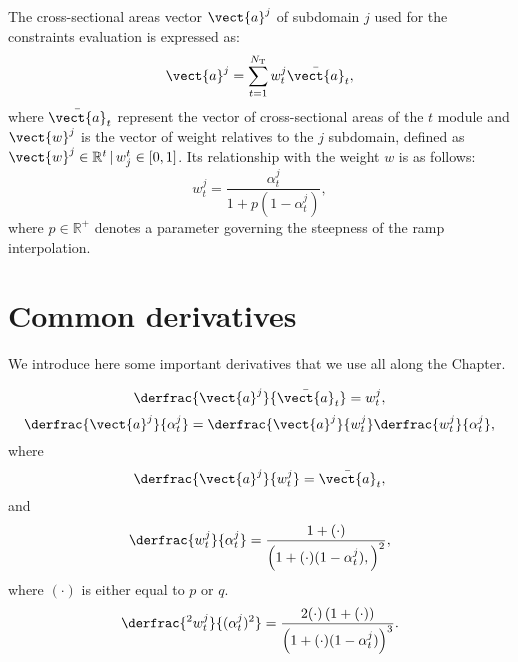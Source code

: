 The cross-sectional areas vector $\vect{a}^j$ of subdomain $j$ used for the constraints evaluation is expressed as:  
\begin{equation}
    \vect{a}^j = \sum_{t=1}^{N_\text{T}} w_t^j \bar{\vect{a}}_t, 
\end{equation}
where $\bar{\vect{a}}_t $ represent the vector of cross-sectional areas of the $t$ module and $\vect{w}^j$ is the vector of weight relatives to the $j$ subdomain, defined as $ \vect{w}^j \in \mathbb{R}^t\,|\,w_j^t \in [0,1]$. Its relationship with the weight $w$ is as follows:
\begin{equation}
    w_t^j = \frac{\alpha_t^j}{1+p(1-\alpha_t^j)},    
\end{equation}
where $p \in \mathbb{R}^+$ denotes a parameter governing the steepness of the \gls{ramp} interpolation.

\section{Common derivatives}
We introduce here some important derivatives that we use all along the Chapter.

\begin{equation}
    \derfrac{\vect{a}^j}{\bar{\vect{a}}_t} = w_t^j,
    \label{eq:appA_02}
\end{equation}
\begin{equation}
    \derfrac{\vect{a}^j}{\alpha_t^j} =  \derfrac{\vect{a}^j}{w_t^j} \derfrac{w_t^j}{\alpha_t^j},
    \label{eq:appA_03}
\end{equation}
where
\begin{equation}
    \derfrac{\vect{a}^j}{w_t^j} = \bar{\vect{a}}_t,
\end{equation}
and
\begin{equation}
    \derfrac{w_t^j}{\alpha_t^j} = \frac{1+(\cdot)}{\left(1+(\cdot)(1-\alpha_t^j),\right)^2},
    \label{eq:appA_01}
\end{equation}
where $(\cdot)$ is either equal to $p$ or $q$.
\begin{equation}
    \derfrac{^2w_t^j}{(\alpha_t^j)^2} = \frac{2(\cdot)\left(1+(\cdot)\right)}{\left(1+(\cdot)(1-\alpha_t^j)\right)^3}.
    \label{eq:appA_04}
\end{equation}

